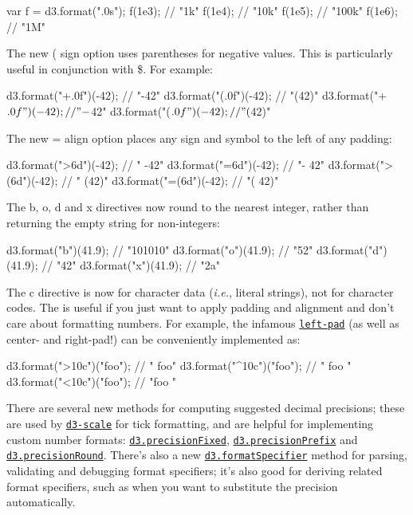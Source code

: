 \begin{DoxyCode}
var f = d3.format(".0s");
f(1e3); // "1k"
f(1e4); // "10k"
f(1e5); // "100k"
f(1e6); // "1M"
\end{DoxyCode}


The new {\ttfamily (} sign option uses parentheses for negative values. This is particularly useful in conjunction with {\ttfamily \$}. For example\+:


\begin{DoxyCode}
d3.format("+.0f")(-42);  // "-42"
d3.format("(.0f")(-42);  // "(42)"
d3.format("+$.0f")(-42); // "-$42"
d3.format("($.0f")(-42); // "($42)"
\end{DoxyCode}


The new {\ttfamily =} align option places any sign and symbol to the left of any padding\+:


\begin{DoxyCode}
d3.format(">6d")(-42);  // "   -42"
d3.format("=6d")(-42);  // "-   42"
d3.format(">(6d")(-42); // "  (42)"
d3.format("=(6d")(-42); // "(  42)"
\end{DoxyCode}


The {\ttfamily b}, {\ttfamily o}, {\ttfamily d} and {\ttfamily x} directives now round to the nearest integer, rather than returning the empty string for non-\/integers\+:


\begin{DoxyCode}
d3.format("b")(41.9); // "101010"
d3.format("o")(41.9); // "52"
d3.format("d")(41.9); // "42"
d3.format("x")(41.9); // "2a"
\end{DoxyCode}


The {\ttfamily c} directive is now for character data ({\itshape i.\+e.}, literal strings), not for character codes. The is useful if you just want to apply padding and alignment and don’t care about formatting numbers. For example, the infamous \href{http://blog.npmjs.org/post/141577284765/kik-left-pad-and-npm}{\tt left-\/pad} (as well as center-\/ and right-\/pad!) can be conveniently implemented as\+:


\begin{DoxyCode}
d3.format(">10c")("foo"); // "       foo"
d3.format("^10c")("foo"); // "   foo    "
d3.format("<10c")("foo"); // "foo       "
\end{DoxyCode}


There are several new methods for computing suggested decimal precisions; these are used by \href{#scales-d3-scale}{\tt d3-\/scale} for tick formatting, and are helpful for implementing custom number formats\+: \href{https://github.com/d3/d3-format/blob/master/README.md#precisionFixed}{\tt d3.\+precision\+Fixed}, \href{https://github.com/d3/d3-format/blob/master/README.md#precisionPrefix}{\tt d3.\+precision\+Prefix} and \href{https://github.com/d3/d3-format/blob/master/README.md#precisionRound}{\tt d3.\+precision\+Round}. There’s also a new \href{https://github.com/d3/d3-format/blob/master/README.md#formatSpecifier}{\tt d3.\+format\+Specifier} method for parsing, validating and debugging format specifiers; it’s also good for deriving related format specifiers, such as when you want to substitute the precision automatically.

